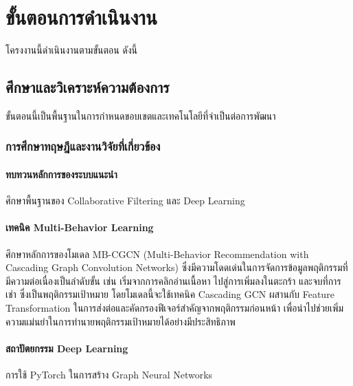 

\section{ขั้นตอนการดำเนินงาน}

โครงงานนี้ดำเนินงานตามขั้นตอน ดังนี้

\subsection{ศึกษาและวิเคราะห์ความต้องการ}

ขั้นตอนนี้เป็นพื้นฐานในการกำหนดขอบเขตและเทคโนโลยีที่จำเป็นต่อการพัฒนา

\subsubsection{การศึกษาทฤษฎีและงานวิจัยที่เกี่ยวข้อง}

\paragraph{ทบทวนหลักการของระบบแนะนำ}
ศึกษาพื้นฐานของ Collaborative Filtering และ Deep Learning

\paragraph{เทคนิค Multi-Behavior Learning}
ศึกษาหลักการของโมเดล MB-CGCN (Multi-Behavior Recommendation with Cascading Graph Convolution Networks) ซึ่งมีความโดดเด่นในการจัดการข้อมูลพฤติกรรมที่มีความต่อเนื่องเป็นลำดับขั้น เช่น เริ่มจากการคลิกอ่านเนื้อหา ไปสู่การเพิ่มลงในตะกร้า และจบที่การเช่า ซึ่งเป็นพฤติกรรมเป้าหมาย โดยโมเดลนี้จะใช้เทคนิค Cascading GCN ผสานกับ Feature Transformation ในการส่งต่อและคัดกรองฟีเจอร์สำคัญจากพฤติกรรมก่อนหน้า เพื่อนำไปช่วยเพิ่มความแม่นยำในการทำนายพฤติกรรมเป้าหมายได้อย่างมีประสิทธิภาพ \cite{mbcgcn_nd}

\paragraph{สถาปัตยกรรม Deep Learning}
การใช้ PyTorch ในการสร้าง Graph Neural Networks

